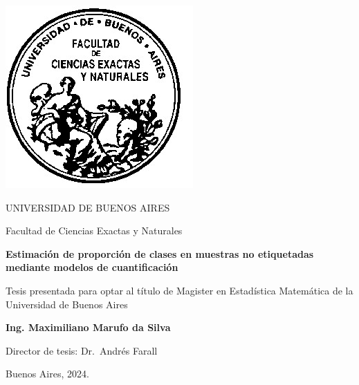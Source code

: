 \thispagestyle{empty}

\begin{center}
  \includegraphics[scale = 0.3]{logofac.jpg}
  
  \medskip
  UNIVERSIDAD DE BUENOS AIRES
  
  Facultad de Ciencias Exactas y Naturales
  
 
  
  \vspace{3cm}
  \textbf{\large Estimación de proporción de clases en muestras no etiquetadas \\ 
  mediante modelos de cuantificación}
  
  \vspace{2cm}
  Tesis presentada para optar al título de Magister en Estadística Matemática de
  la Universidad de Buenos Aires
  
  \vspace{2cm}
  \textbf{Ing. Maximiliano Marufo da Silva}
\end{center}


\vspace{1.5cm}
\noindent Director de tesis: Dr.~Andrés Farall
 

\vspace{1cm}
\noindent Buenos Aires, 2024.
